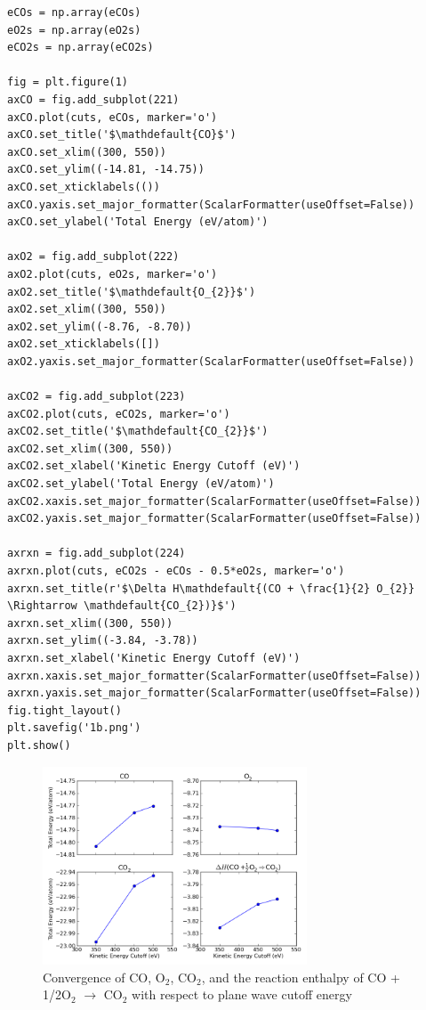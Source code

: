 \documentclass[11pt]{article}
\begin{document}
\begin{verbatim}
eCOs = np.array(eCOs)
eO2s = np.array(eO2s)
eCO2s = np.array(eCO2s)

fig = plt.figure(1)
axCO = fig.add_subplot(221)
axCO.plot(cuts, eCOs, marker='o')
axCO.set_title('$\mathdefault{CO}$')
axCO.set_xlim((300, 550))
axCO.set_ylim((-14.81, -14.75))
axCO.set_xticklabels(())
axCO.yaxis.set_major_formatter(ScalarFormatter(useOffset=False))
axCO.set_ylabel('Total Energy (eV/atom)')

axO2 = fig.add_subplot(222)
axO2.plot(cuts, eO2s, marker='o')
axO2.set_title('$\mathdefault{O_{2}}$')
axO2.set_xlim((300, 550))
axO2.set_ylim((-8.76, -8.70))
axO2.set_xticklabels([])
axO2.yaxis.set_major_formatter(ScalarFormatter(useOffset=False))

axCO2 = fig.add_subplot(223)
axCO2.plot(cuts, eCO2s, marker='o')
axCO2.set_title('$\mathdefault{CO_{2}}$')
axCO2.set_xlim((300, 550))
axCO2.set_xlabel('Kinetic Energy Cutoff (eV)')
axCO2.set_ylabel('Total Energy (eV/atom)')
axCO2.xaxis.set_major_formatter(ScalarFormatter(useOffset=False))
axCO2.yaxis.set_major_formatter(ScalarFormatter(useOffset=False))

axrxn = fig.add_subplot(224)
axrxn.plot(cuts, eCO2s - eCOs - 0.5*eO2s, marker='o')
axrxn.set_title(r'$\Delta H\mathdefault{(CO + \frac{1}{2} O_{2}} \Rightarrow \mathdefault{CO_{2})}$')
axrxn.set_xlim((300, 550))
axrxn.set_ylim((-3.84, -3.78))
axrxn.set_xlabel('Kinetic Energy Cutoff (eV)')
axrxn.xaxis.set_major_formatter(ScalarFormatter(useOffset=False))
axrxn.yaxis.set_major_formatter(ScalarFormatter(useOffset=False))
fig.tight_layout()
plt.savefig('1b.png')
plt.show()
\end{verbatim}

\begin{figure}[H]
\centering
\includegraphics[width=0.7\textwidth]{./1b.png}
\caption{Convergence of CO, O$_{2}$, CO$_{2}$, and the reaction enthalpy of CO + 1/2O$_{2}$ $\rightarrow$ CO$_{2}$ with respect to plane wave cutoff energy}
\end{figure}
\end{document}
